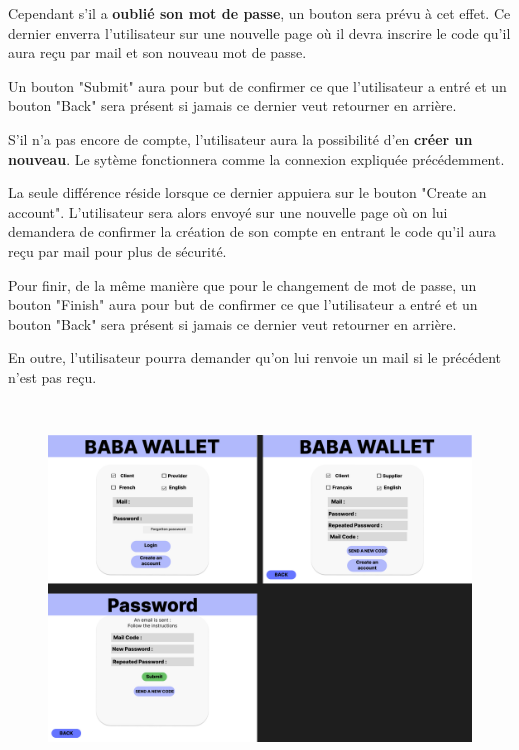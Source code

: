 \begin{flushleft}
Cependant s'il a \textbf{oublié son mot de passe}, un bouton sera prévu à cet effet.
Ce dernier enverra l'utilisateur sur une nouvelle page où il devra inscrire le code qu'il aura reçu par mail et son nouveau mot de passe.
\end{flushleft}

\begin{flushleft}
Un bouton "Submit" aura pour but de confirmer ce que l'utilisateur a entré et un bouton "Back" sera présent si jamais ce dernier veut retourner en arrière.
\end{flushleft}


\begin{flushleft}
S'il n'a pas encore de compte, l'utilisateur aura la possibilité d'en \textbf{créer un nouveau}. 
Le sytème fonctionnera comme la connexion expliquée précédemment.
\end{flushleft}

\begin{flushleft}
La seule différence réside lorsque ce dernier appuiera sur le bouton "Create an account". 
L'utilisateur sera alors envoyé sur une nouvelle page où on lui demandera de confirmer la création de son compte en entrant le code qu'il aura reçu par mail pour plus de sécurité.
\end{flushleft}

\begin{flushleft}
Pour finir, de la même manière que pour le changement de mot de passe, un bouton "Finish" aura pour but de confirmer ce que l'utilisateur a entré et un bouton "Back" sera présent si jamais ce dernier veut retourner en arrière.
\end{flushleft}

\begin{flushleft}
En outre, l'utilisateur pourra demander qu'on lui renvoie un mail si le précédent n'est pas reçu.
\end{flushleft}\

\newpage
\begin{figure}
    \centering
    \includegraphics[width = 1\textwidth]{Base/interface/img/Log.png}
\end{figure}
\newpage
